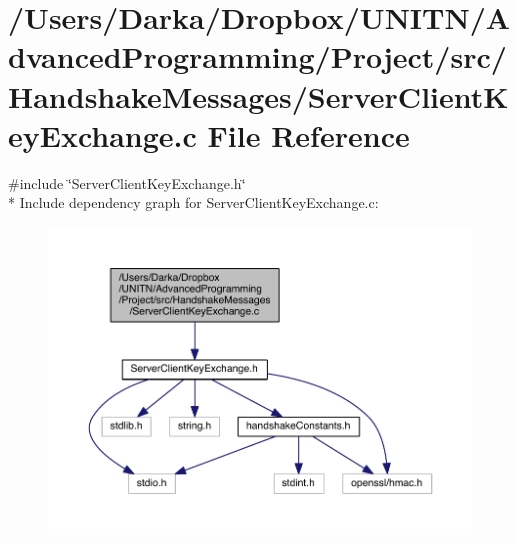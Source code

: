 \section{/\+Users/\+Darka/\+Dropbox/\+U\+N\+I\+T\+N/\+Advanced\+Programming/\+Project/src/\+Handshake\+Messages/\+Server\+Client\+Key\+Exchange.c File Reference}
\label{_server_client_key_exchange_8c}
{\ttfamily \#include \char`\"{}Server\+Client\+Key\+Exchange.\+h\char`\"{}}\\*
Include dependency graph for Server\+Client\+Key\+Exchange.\+c\+:\nopagebreak
\begin{figure}[H]
\begin{center}
\leavevmode
\includegraphics[width=350pt]{_server_client_key_exchange_8c__incl}
\end{center}
\end{figure}
